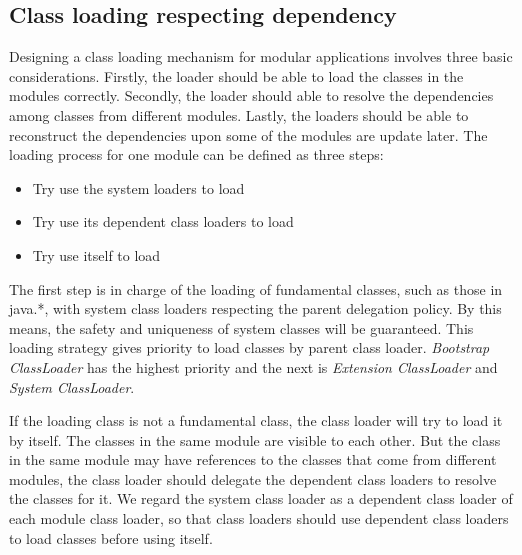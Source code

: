 \documentclass[conference]{IEEEtran}
\begin{document}
\subsection{Class loading respecting dependency}

Designing a class loading mechanism for modular applications involves three basic considerations. Firstly, the loader should be able to load the classes in the modules correctly. Secondly, the loader should able to resolve the dependencies among classes from different modules. Lastly, the loaders should be able to reconstruct the dependencies upon some of the modules are update later. 
The loading process for one module can be defined as three steps:
\begin{itemize}
\item Try use the system loaders to load
\item Try use its dependent class loaders to load
\item Try use itself to load
\end{itemize}

The first step is in charge of the loading of fundamental classes, such as those in java.*, with system class loaders respecting the parent delegation policy\cite{parent_delegation}. By this means, the safety and uniqueness of system classes will be guaranteed. This loading strategy gives priority to load classes by parent class loader. \emph{Bootstrap ClassLoader} has the highest priority and the next is \emph{Extension ClassLoader} and \emph{System ClassLoader}. 

If the loading class is not a fundamental class, the class loader will try to load it by itself. The classes in the same module are visible to each other. But the class in the same module may have references to the classes that come from different modules, the class loader should delegate the dependent class loaders to resolve the classes for it. We regard the system class loader as a dependent class loader of each module class loader, so that class loaders should use dependent class loaders to load classes before using itself.
\end{document}
